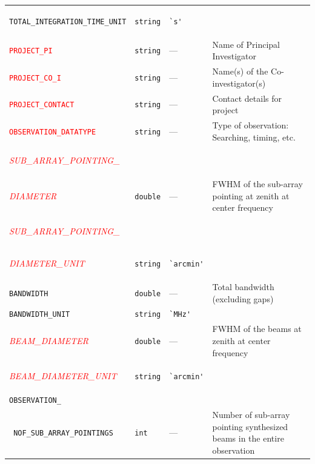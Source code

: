 \documentclass[a4paper,10pt,bibtotoc]{scrartcl}
\begin{document}
\begin{supertabular}{|lllp{5.5cm}|}
  \begin{small}\verb|TOTAL_INTEGRATION_TIME_UNIT|\end{small} & \verb|string| & \verb|`s'| & \\
  \textcolor{red}{\texttt{PROJECT\_PI}} & \small\verb|string| & --- &  Name of Principal Investigator \\
  \textcolor{red}{\texttt{PROJECT\_CO\_I}} & \small\verb|string| & --- &  Name(s) of the Co-investigator(s) \\
  \textcolor{red}{\texttt{PROJECT\_CONTACT}} & \small\verb|string| & --- &  Contact details for project \\
  \textcolor{red}{\texttt{OBSERVATION\_DATATYPE}}  & \verb|string| & --- & Type of observation: Searching, timing, etc. \\
  \begin{scriptsize}\textcolor{red}{\textit{SUB\_ARRAY\_POINTING\_}}\end{scriptsize} &  &  & \\
  \begin{scriptsize}\textcolor{red}{\textit{ DIAMETER}}\end{scriptsize} & \verb|double| & --- & FWHM of the sub-array pointing at zenith at center frequency \\
  \begin{scriptsize}\textcolor{red}{\textit{SUB\_ARRAY\_POINTING\_}}\end{scriptsize}  &  &  & \\
  \begin{scriptsize}\textcolor{red}{\textit{ DIAMETER\_UNIT}}\end{scriptsize}  & \verb|string| & \verb|`arcmin'| & \\
  \verb|BANDWIDTH|  & \verb|double| & --- & Total bandwidth (excluding gaps) \\
  \verb|BANDWIDTH_UNIT|  & \verb|string| & \verb|`MHz'| & \\
  \begin{scriptsize}\textcolor{red}{\textit{BEAM\_DIAMETER}}\end{scriptsize}  & \verb|double| & --- & FWHM of the beams at zenith at center frequency \\
  \begin{scriptsize}\textcolor{red}{\textit{BEAM\_DIAMETER\_UNIT}}\end{scriptsize}  & \verb|string| & \verb|`arcmin'| & \\
  \verb|OBSERVATION_|  &  &  &  \\
  \verb| NOF_SUB_ARRAY_POINTINGS|  & \verb|int| & --- & Number of sub-array pointing synthesized beams in the entire observation \\

\end{supertabular}
\end{document}
